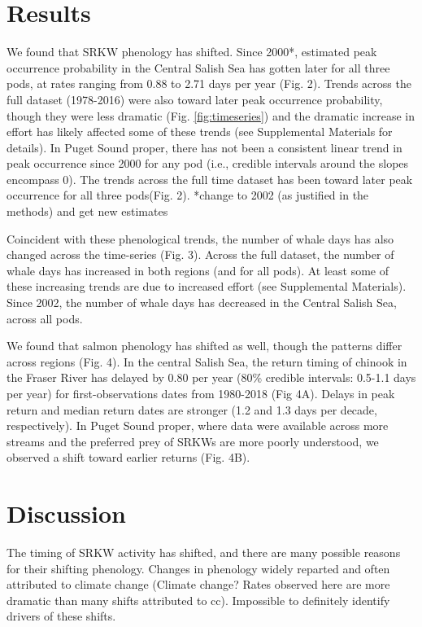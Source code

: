 \documentclass{article}
\begin{document}
\section*{Results}
\par We found that SRKW phenology has shifted. Since 2000*, estimated peak occurrence probability in the Central Salish Sea has gotten later for all three pods, at rates ranging from 0.88  to 2.71 days per year (Fig. 2). Trends across the full dataset (1978-2016) were also toward later peak occurrence probability, though they were less dramatic (Fig. \ref{fig:timeseries}) and the dramatic increase in effort has likely affected some of these trends (see Supplemental Materials for details).  In Puget Sound proper, there has not been a consistent linear trend in peak occurrence since 2000 for any pod (i.e., credible intervals around the slopes encompass 0). The trends across the full time dataset has been toward later peak occurrence for all three pods(Fig. 2). 
*change to 2002 (as justified in the methods) and get new estimates
\par Coincident with these phenological trends, the number of whale days has also changed across the time-series (Fig. 3). Across the full dataset, the number of whale days has increased in both regions (and for all pods). At least some of these increasing trends are due to increased effort (see Supplemental Materials). Since 2002, the number of whale days has decreased in the Central Salish Sea, across all pods. 
\par We found that salmon phenology has shifted as well, though the patterns differ across regions (Fig. 4). In the central Salish Sea, the return timing of chinook in the Fraser River has delayed by 0.80 per year (80\% credible intervals: 0.5-1.1 days per year) for first-observations dates from 1980-2018 (Fig 4A).  Delays in peak return and median return dates are stronger (1.2 and 1.3 days per decade, respectively). In Puget Sound proper, where data were available across more streams and the preferred prey of SRKWs are more poorly understood, we observed a shift toward earlier returns (Fig. 4B).
\par
\section*{Discussion}
\par The timing of SRKW activity has shifted, and there are many possible reasons for their shifting phenology. Changes in phenology widely reparted and often attributed to climate change (Climate change? Rates observed here are more dramatic than many shifts attributed to cc). Impossible to definitely identify drivers of these shifts.
\end{document}
